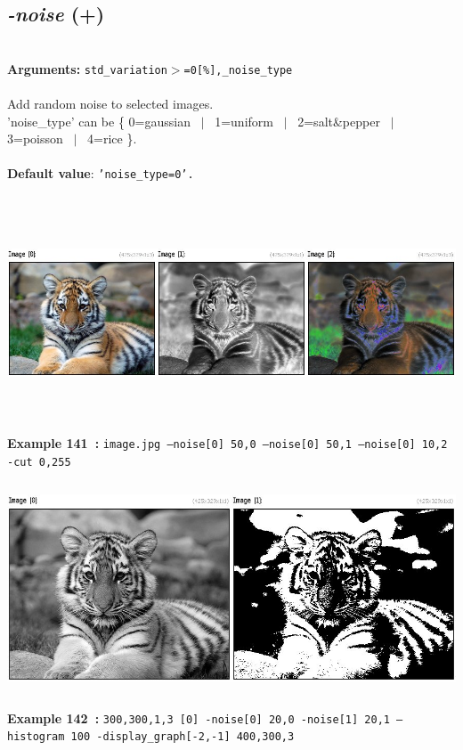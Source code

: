 \documentclass[a4paper,11pt,twoside]{book}
\begin{document}
\subsection{\emph{-noise} (+)}\vspace*{-0.5em}
~\\\textbf{Arguments: } 
{\small \texttt{std\_variation$>$=0[\%],\_noise\_type}}\\~\\
Add random noise to selected images.
~\\'noise\_type' can be \{ 0=gaussian ~$|$~ 1=uniform ~$|$~ 2=salt\&pepper ~$|$~ 3=poisson ~$|$~ 4=rice \}.
~\\~\\\textbf{Default value}: {\small \texttt{'noise\_type=0'.}}
\begin{center}\includegraphics[keepaspectratio=true,height=7cm,width=\textwidth]{img/gmic_def141.jpg}\\
{\footnotesize \textbf{Example 141~:} \texttt{image.jpg --noise[0] 50,0 --noise[0] 50,1 --noise[0] 10,2 -cut 0,255}}
\\\includegraphics[keepaspectratio=true,height=7cm,width=\textwidth]{img/gmic_def142.jpg}\\
{\footnotesize \textbf{Example 142~:} \texttt{300,300,1,3 [0] -noise[0] 20,0 -noise[1] 20,1 --histogram 100 -display\_graph[-2,-1] 400,300,3}}
\end{center}
\end{document}
